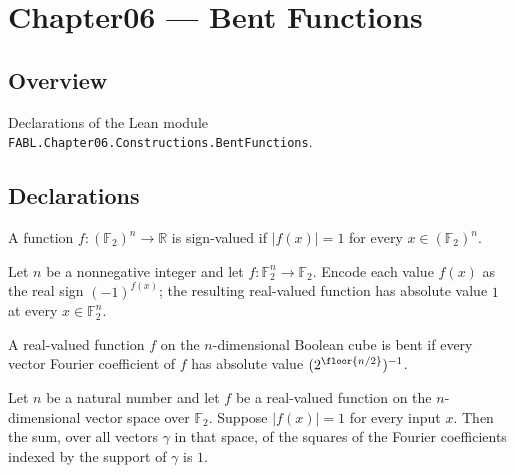 \chapter{Chapter06 — Bent Functions}
\section{Overview}

Declarations of the Lean module \texttt{FABL.Chapter06.Constructions.BentFunctions}.

\section{Declarations}

\begin{definition}
\label{FABL.IsSignValued}
\leanok
{}
A function $f:(\mathbb F_2)^n\to\mathbb R$ is sign-valued if $|f(x)|=1$ for every
$x\in(\mathbb F_2)^n$.
\end{definition}

\begin{theorem}
\label{FABL.isSignValued_realSignEncodedFunction}
\leanok
{}
Let $n$ be a nonnegative integer and let $f:\mathbb F_2^n\to\mathbb F_2$. Encode each
value $f(x)$ as the real sign $(-1)^{f(x)}$; the resulting real-valued function has
absolute value $1$ at every $x\in\mathbb F_2^n$.
\end{theorem}

\begin{definition}
\label{FABL.IsBent}
\leanok
{}
A real-valued function $f$ on the $n$-dimensional Boolean cube is bent if every vector
Fourier coefficient of $f$ has absolute value $(2^{\floor{n/2}})^{-1}$.
\end{definition}

\begin{theorem}
\label{FABL.sum_sq_vectorFourierCoeff_eq_one}
\leanok
{}
Let $n$ be a natural number and let $f$ be a real-valued function on the $n$-dimensional
vector space over $\mathbb F_2$. Suppose $|f(x)|=1$ for every input $x$. Then the sum,
over all vectors $\gamma$ in that space, of the squares of the Fourier coefficients
indexed by the support of $\gamma$ is $1$.
\end{theorem}

